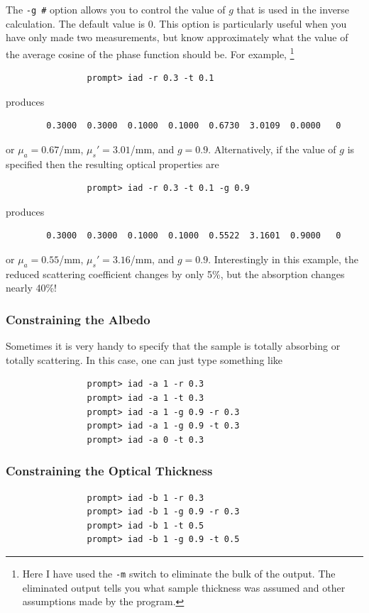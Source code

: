 \documentclass{article}
\begin{document}
The \texttt{-g \#} option allows you to control the value of $g$ that is used in the inverse
calculation.  The default value is 0.  This option is particularly useful when you have only made two measurements,
but know approximately what the value of the average cosine of the phase function 
should be.  For example,%
\footnote{Here I have used the \texttt{-m} switch to eliminate the bulk
of the output.  The eliminated output tells you what sample thickness was assumed and other 
assumptions made by the program.}
\begin{verbatim}
                prompt> iad -r 0.3 -t 0.1
\end{verbatim}
produces
\begin{verbatim}
        0.3000  0.3000  0.1000  0.1000  0.6730  3.0109  0.0000   0
\end{verbatim}
or $\mu_a=0.67$/mm, $\mu_s'=3.01$/mm, and $g=0.9$.  Alternatively, if the
value of $g$ is specified then the resulting optical properties are 
\begin{verbatim}
                prompt> iad -r 0.3 -t 0.1 -g 0.9
\end{verbatim}
produces
\begin{verbatim}
        0.3000  0.3000  0.1000  0.1000  0.5522  3.1601  0.9000   0
\end{verbatim}
or $\mu_a=0.55$/mm, $\mu_s'=3.16$/mm, and $g=0.9$.  Interestingly in this
example, the reduced scattering coefficient changes by only 5\%, but the
absorption changes nearly 40\%!

\subsubsection{Constraining the Albedo}

Sometimes it is very handy to specify that the sample is totally absorbing
or totally scattering.  In this case, one can just type something like
\begin{verbatim}
                prompt> iad -a 1 -r 0.3
                prompt> iad -a 1 -t 0.3
                prompt> iad -a 1 -g 0.9 -r 0.3
                prompt> iad -a 1 -g 0.9 -t 0.3
                prompt> iad -a 0 -t 0.3
\end{verbatim}

\subsubsection{Constraining the Optical Thickness}

\begin{verbatim}
                prompt> iad -b 1 -r 0.3
                prompt> iad -b 1 -g 0.9 -r 0.3
                prompt> iad -b 1 -t 0.5
                prompt> iad -b 1 -g 0.9 -t 0.5
\end{verbatim}
\end{document}
